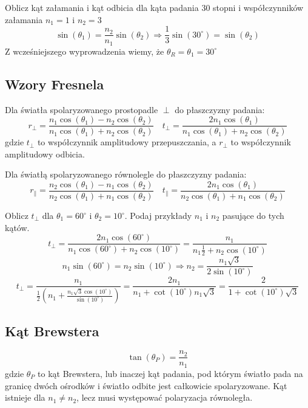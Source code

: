 \documentclass{../notatki}
\begin{document}
\begin{examplebox}
  Oblicz kąt załamania i kąt odbicia dla kąta padania 30 stopni i
  współczynników załamania $n_1=1$ i $n_2=3$
  $$
  \sin(\theta_1) = \frac{n_2}{n_1} \sin(\theta_2) \Rightarrow
  \frac{1}{3} \sin(30^\circ) =  \sin(\theta_2)
  $$
  Z wcześniejszego wyprowadzenia wiemy, że $\theta_R = \theta_1 = 30^\circ$
\end{examplebox}

\subsection{Wzory Fresnela}

Dla światła spolaryzowanego prostopadle $\perp$ do płaszczyzny padania:
$$
r_\perp = \frac{n_1 \cos(\theta_1) - n_2 \cos(\theta_2)}{n_1
\cos(\theta_1) + n_2 \cos(\theta_2)} \quad t_\perp = \frac{2 n_1
\cos(\theta_1)}{n_1
\cos(\theta_1) + n_2 \cos(\theta_2)}
$$
gdzie $t_\perp$ to współczynnik amplitudowy przepuszczania, a
$r_\perp$ to współczynnik amplitudowy odbicia.

Dla światłą spolaryzowanego równolegle do płaszczyzny padania:
$$
r_\parallel = \frac{n_2 \cos(\theta_1) - n_1 \cos(\theta_2)}{n_2
\cos(\theta_1) + n_1 \cos(\theta_2)} \quad t_\parallel = \frac{2 n_1
\cos(\theta_1)}{n_2 \cos(\theta_1) + n_1 \cos(\theta_2)}
$$

\begin{examplebox}
  Oblicz $t_\perp$ dla $\theta_1=60^\circ$ i $\theta_2=10^\circ$. Podaj
  przykłady $n_1$ i $n_2$ pasujące do tych kątów.
  $$
  t_\perp = \frac{2 n_1 \cos(60^\circ)}{n_1 \cos(60^\circ) + n_2
  \cos(10^\circ)} = \frac{n_1}{n_1 \frac{1}{2} + n_2 \cos(10^\circ)}
  $$
  $$
  n_1 \sin(60^\circ) = n_2 \sin(10^\circ) \Rightarrow n_2 =
  \frac{n_1 \sqrt{3}}{2 \sin(10^\circ)}
  $$
  $$
  t_\perp = \frac{n_1}{\frac{1}{2} \left(n_1 + \frac{n_1 \sqrt{3}
  \cos(10^\circ)}{\sin(10^\circ)} \right)} = \frac{2 n_1}{n_1 +
  \cot(10^\circ) n_1 \sqrt{3}} = \frac{2}{1 + \cot(10^\circ) \sqrt{3}}
  $$
\end{examplebox}

\subsection{Kąt Brewstera}

$$
\tan(\theta_P) = \frac{n_2}{n_1}
$$
gdzie $\theta_P$ to kąt Brewstera, lub inaczej kąt padania, pod którym światło
pada na granicę dwóch ośrodków i światło odbite jest całkowicie spolaryzowane.
Kąt istnieje dla $n_1 \neq n_2$, lecz musi występować polaryzacja równoległa.
\end{document}
